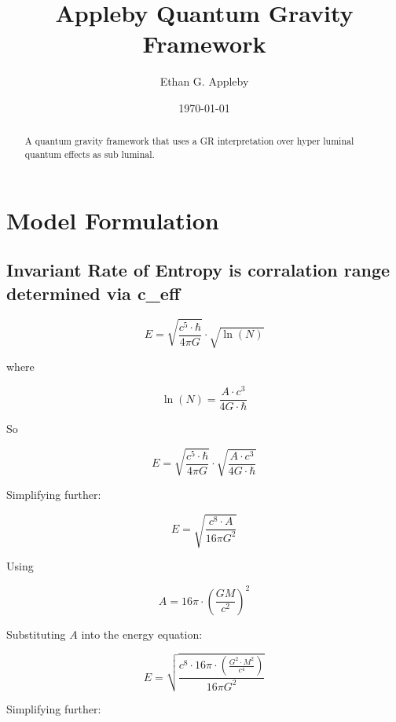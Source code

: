 \documentclass[a4paper, 11pt]{article}
\title{Appleby Quantum Gravity Framework}
\author{Ethan G. Appleby}
\date{\today}
\begin{document}
\maketitle

\begin{abstract}
A quantum gravity framework that uses a GR interpretation over hyper luminal quantum effects as sub luminal.
\end{abstract}

\section{Model Formulation}

\subsection{Invariant Rate of Entropy is corralation range determined via c_eff}

\begin{equation}
E = \sqrt{\frac{c^5 \cdot \hbar}{4\pi G}} \cdot \sqrt{\ln(N)}
\end{equation}

where

\begin{equation}
\ln(N) = \frac{A \cdot c^3}{4G \cdot \hbar}
\end{equation}

So

\begin{equation}
E = \sqrt{\frac{c^5 \cdot \hbar}{4\pi G}} \cdot \sqrt{\frac{A \cdot c^3}{4G \cdot \hbar}}
\end{equation}

Simplifying further:

\begin{equation}
E = \sqrt{\frac{c^8 \cdot A}{16\pi G^2}}
\end{equation}

Using

\begin{equation}
A = 16\pi \cdot \left(\frac{GM}{c^2}\right)^2
\end{equation}

Substituting \( A \) into the energy equation:

\begin{equation}
E = \sqrt{\frac{c^8 \cdot 16\pi \cdot \left(\frac{G^2 \cdot M^2}{c^4}\right)}{16\pi G^2}}
\end{equation}

Simplifying further:
\end{document}
